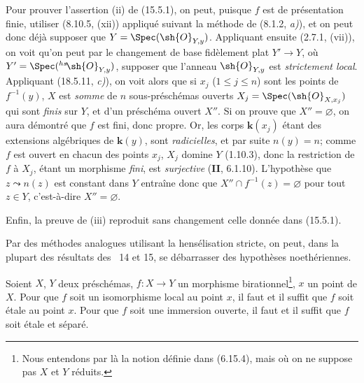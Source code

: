 Pour prouver l'assertion (ii) de (15.5.1), on peut, puisque $f$ est de présentation finie, utiliser (8.10.5, (xii)) appliqué suivant la méthode de (8.1.2, \emph{a)}), et on peut donc déjà supposer que $Y=\Spec(\sh{O}_{Y,y})$. Appliquant ensuite (2.7.1, (vii)), on voit qu'on peut par le changement de base fidèlement plat $Y'\to Y$, où $Y'=\Spec({}^{hs}\!\sh{O}_{Y,y})$, supposer que l'anneau $\sh{O}_{Y,y}$ est \emph{strictement local}. Appliquant (18.5.11, \emph{c)}), on voit alors que si $x_j$ ($1\leq j\leq n$) sont les points de $f^{-1}(y)$, $X$ est \emph{somme} de $n$ sous-préschémas ouverts $X_j=\Spec(\sh{O}_{X,x_j})$ qui sont \emph{finis} sur $Y$, et d'un préschéma ouvert $X''$. Si on prouve que $X''=\varnothing$, on aura démontré que $f$ est fini, donc propre. Or, les corps $\boldsymbol{k}(x_j)$ étant des extensions algébriques de $\boldsymbol{k}(y)$, sont \emph{radicielles}, et par suite $n(y)=n$; comme $f$ est ouvert en chacun des points $x_j$, $X_j$ domine $Y$ (1.10.3), donc la restriction de $f$ à $X_j$, étant un morphisme \emph{fini}, est \emph{surjective} (\textbf{II}, 6.1.10). L'hypothèse que $z\leadsto n(z)$ est constant dans $Y$ entraîne donc que $X''\cap f^{-1}(z)=\varnothing$ pour tout $z\in Y$, c'est-à-dire $X''=\varnothing$.

Enfin, la preuve de (iii) reproduit sans changement celle donnée dans (15.5.1).

\begin{env}[18.10.17.2]
\label{IV.18.10.17.2}
Par des méthodes analogues utilisant la hensélisation stricte, on peut, dans la plupart des résultats des \textsection\textsection~14 et 15, se débarrasser des hypothèses noethériennes.
\end{env}

\begin{lemma}[18.10.18]
\label{IV.18.10.18}
Soient $X$, $Y$ deux préschémas, $f:X\to Y$ un morphisme birationnel\footnote{Nous entendons par là la notion définie dans (6.15.4), mais où on ne suppose pas $X$ et $Y$ réduits.}, $x$ un point de $X$. Pour que $f$ soit un isomorphisme local au point $x$, il faut et il suffit que $f$ soit étale au point $x$. Pour que $f$ soit une immersion ouverte, il faut et il suffit que $f$ soit étale et séparé.
\end{lemma}

